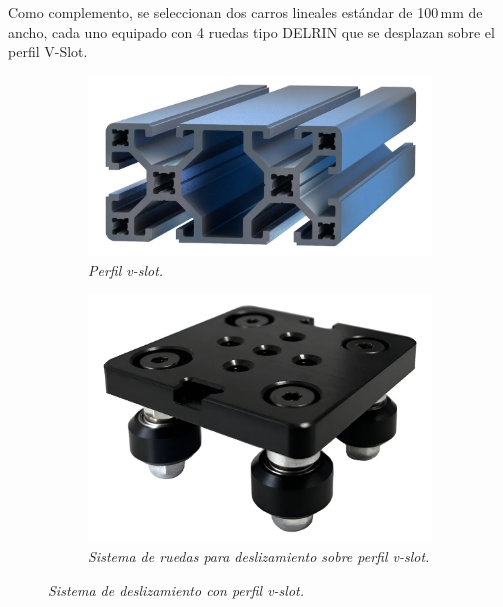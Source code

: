 Como complemento, se seleccionan dos carros lineales estándar de 100\,mm de ancho, cada uno equipado con 4 ruedas tipo DELRIN que se desplazan sobre el perfil V-Slot.
\begin{figure}[H]
    \centering
    \begin{subfigure}{0.4\textwidth}
        \centering
        \includegraphics[width=\textwidth]{img/vslot_40x80.png}
        \caption{\textit{Perfil v-slot.}}
        \label{fig:vslot_40x80}
    \end{subfigure}
    \hfill
    \begin{subfigure}{0.4\textwidth}
        \centering
        \includegraphics[width=\textwidth]{img/carro_perfilvslot.png}
        \caption{\textit{Sistema de ruedas para deslizamiento sobre perfil v-slot.}}
        \label{fig:carro_perfilvslot}
    \end{subfigure}
    \caption{\textit{Sistema de deslizamiento con perfil v-slot.}}
\end{figure}

